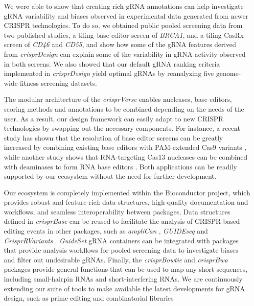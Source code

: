 \documentclass[pdftex,english,10pt]{article}
\begin{document}
We were able to show that creating rich gRNA annotations can help investigate gRNA variability and biases observed in experimental data generated from newer CRISPR technologies. To do so, we obtained public pooled screening data from two published studies, a tiling base editor screen of \textit{BRCA1}, and a tiling CasRx screen of \textit{CD46} and \textit{CD55}, and show how some of the gRNA features derived from \textit{crisprDesign} can explain some of the variability in gRNA activity observed in both screens. We also showed that our default gRNA ranking criteria implemented in \textit{crisprDesign} yield optimal gRNAs by reanalyzing five genome-wide fitness screening datasets. 


The modular architecture of the \textit{crisprVerse} enables nucleases, base editors, scoring methods and annotations to be combined depending on the needs of the user. As a result, our design framework can easily adapt to new CRISPR technologies by swapping out the necessary components. For instance, a recent study has shown that the resolution of base editor screens can be greatly increased by combining existing base editors with PAM-extended Cas9 variants \citep{sangree2021benchmarking}, while another study shows that RNA-targeting Cas13 nucleases can be combined with deaminases to form RNA base editors \citep{rnaediting1}. Both applications can be readily supported by our ecosystem without the need for further development. 


Our ecosystem is completely implemented within the Bioconductor project, which provides robust and feature-rich data structures, high-quality documentation and workflows, and seamless interoperability between packages. Data structures defined in \textit{crisprBase} can be reused to facilitate the analysis of CRISPR-based editing events in other packages, such as \textit{ampliCan} \citep{labun2019accurate}, 
\textit{GUIDEseq} \citep{zhu2017guideseq} and \textit{CrisprRVariants} \citep{lindsay2016crisprvariants}. \textit{GuideSet} gRNA containers can be integrated with packages that provide analysis workflows for pooled screening data  \citep{wang2019integrative, imkeller2020gscreend, gcrisprtools} to investigate biases and filter out undesirable gRNAs. Finally, the \textit{crisprBowtie} and \textit{crisprBwa} packages provide general functions that can be used to map any short sequences, including small-hairpin RNAs and short-interfering RNAs. We are continuously extending our suite of tools to make available the latest developments for gRNA design, such as prime editing \citep{primeediting} and combinatorial libraries \citep{replogle2020combinatorial}
 
\end{document}
